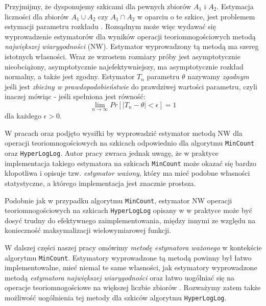        Przyjmijmy, że dysponujemy szkicami dla pewnych zbiorów $A_1$ i $A_2$. Estymacja liczności dla zbiorów $A_1 \cup A_2$ czy 
       $A_1 \cap A_2$ w oparciu o te szkice, jest problemem estymacji parametru rozkładu \cite{ting}. Rozsądnym może więc wydawać się wyprowadzenie estymatorów dla wyników operacji teoriomnogościowych metodą \textit{największej wiarygodności} (NW).
       Estymator wyprowadzony tą metodą ma szereg istotnych własności. Wraz ze wzrostem rozmiary próby jest asymptotycznie nieobciążony, asymptotycznie najefektywniejszy, ma asymptotycznie rozkład normalny, a także jest zgodny. Estymator $T_n$ parametru $\theta$ nazywamy \textit{zgodnym} jeśli jest \textit{zbieżny w prawdopodobieństwie} 
        do prawdziwej wartości parametru, czyli inaczej mówiąc - jeśli spełniona jest równość:
       \begin{equation}
     		\lim_{n \to \infty} Pr[|T_n - \theta| < \epsilon] = 1
     		\label{consistent_def}
       \end{equation}
       dla każdego $\epsilon > 0$.
%       
      
      W pracach \cite{ting} oraz \cite{oertl} podjęto wysiłki
      by wyprowadzić estymator metodą NW dla operacji teoriomnogościowych na szkicach odpowiednio dla algorytmu \texttt{MinCount} oraz \texttt{HyperLogLog}.
      Autor pracy \cite{ting} zwraca jednak uwagę, że
      w praktyce implementacja takiego estymatora na szkicach \texttt{MinCount} może okazać się bardzo kłopotliwa i opisuje tzw. \textit{estymator ważony}, który ma  mieć podobne własności statystyczne, a którego implementacja jest znacznie prostsza. 
  
 Podobnie jak w przypadku algorytmu \texttt{MinCount}, estymator NW operacji teoriomnogościowych na szkicach \texttt{HyperLogLog} opisany w 
 \cite{oertl} w praktyce może być dosyć trudny do efektywnego zaimplementowania, między innymi ze względu na konieczność maksymalizacji wielowymiarowej funkcji.
       
        W dalszej części naszej pracy omówimy  \textit{metodę estymatora ważonego} w kontekście algorytmu 
        \texttt{MinCount}. 
        Estymatory wyprowadzone tą metodą powinny był łatwo implementowalne, mieć niemal te same własności, jak estymatory wyprowadzone metodą \textit{estymatora największej wiarygodności} oraz łatwo uogólniać się na operacje teoriomnogościowe na większej liczbie zbiorów \cite{ting}.         
        Rozważymy zatem także  możliwość uogólnienia tej metody  dla szkiców algorytmu \texttt{HyperLogLog}.
        
        

       
       
       
